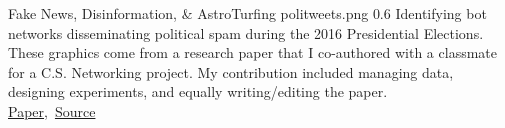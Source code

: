 \cvexample
  {Fake News, Disinformation, \& AstroTurfing}
  {politweets.png}
  {0.6}
  {%
    Identifying bot networks disseminating political spam during the 2016 Presidential Elections.
    These graphics come from a research paper that I co-authored with a classmate for a C.S. Networking project.
    My contribution included managing data, designing experiments, and equally writing/editing the paper.\\
    \raggedleft\href{https://github.com/ryan-p-larson/polititweets/raw/master/OpinionMachine.pdf}{Paper},\, \href{https://github.com/ryan-p-larson/polititweets}{Source}\quad
  }